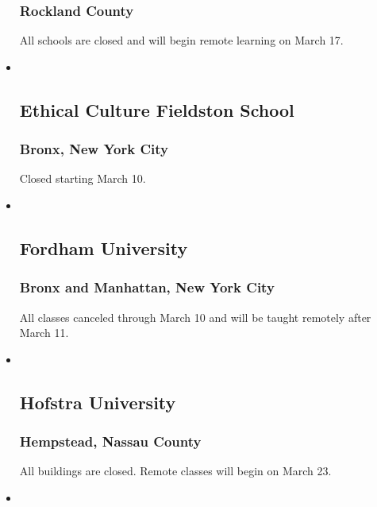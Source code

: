 \begin{itemize}
  \hypertarget{rockland-county}{%
  \subsubsection{Rockland County}\label{rockland-county}}

  All schools are closed and will begin remote learning on March 17.
\item ~
  \hypertarget{ethical-culture-fieldston-school}{%
  \subsection{Ethical Culture Fieldston
  School}\label{ethical-culture-fieldston-school}}

  \hypertarget{bronx-new-york-city}{%
  \subsubsection{Bronx, New York City}\label{bronx-new-york-city}}

  Closed starting March 10.
\item ~
  \hypertarget{fordham-university}{%
  \subsection{Fordham University}\label{fordham-university}}

  \hypertarget{bronx-and-manhattan-new-york-city}{%
  \subsubsection{Bronx and Manhattan, New York
  City}\label{bronx-and-manhattan-new-york-city}}

  All classes canceled through March 10 and will be taught remotely
  after March 11.
\item ~
  \hypertarget{hofstra-university}{%
  \subsection{Hofstra University}\label{hofstra-university}}

  \hypertarget{hempstead-nassau-county}{%
  \subsubsection{Hempstead, Nassau
  County}\label{hempstead-nassau-county}}

  All buildings are closed. Remote classes will begin on March 23.
\item ~
  \hypertarget{horace-mann-school}{%
}
\end{itemize}
